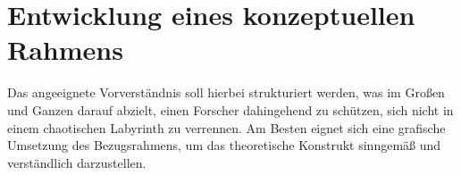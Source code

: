 
\chapter{Entwicklung eines konzeptuellen Rahmens}
\label{chap:Rahmen}

Das angeeignete Vorverständnis soll hierbei strukturiert werden, was im Großen und Ganzen darauf abzielt, einen Forscher dahingehend zu schützen, sich nicht in einem chaotischen Labyrinth zu verrennen. Am Besten eignet sich eine grafische Umsetzung des Bezugsrahmens, um das theoretische Konstrukt sinngemäß und verständlich darzustellen.










